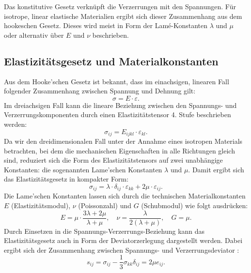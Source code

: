 Das konstitutive Gesetz verknüpft die Verzerrungen mit den Spannungen. Für isotrope, linear elastische Materialien ergibt sich dieser Zusammenhang aus dem hookeschen Gesetz. Dieses wird meist in Form der Lamé-Konstanten $\lambda$ und $\mu$ oder alternativ über $E$ und $\nu$ beschrieben.

\subsection{Elastizitätsgesetz und Materialkonstanten}
Aus dem Hooke’schen Gesetz ist bekannt, dass im einachsigen, linearen Fall folgender Zusammenhang zwischen Spannung und Dehnung gilt:
\begin{equation}
	\sigma = 
	E \cdot \varepsilon.
\end{equation}
Im dreiachsigen Fall kann die lineare Beziehung zwischen den Spannungs- und Verzerrungskomponenten durch einen Elastizitätstensor 4. Stufe beschrieben werden:
\begin{equation}
	\sigma_{ij} = 
	E_{ijkl} \cdot \varepsilon_{kl}.
\end{equation}
Da wir den dreidimensionalen Fall unter der Annahme eines isotropen Materials betrachten, bei dem die mechanischen Eigenschaften in alle Richtungen gleich sind, reduziert sich die Form des Elastizitätstensors auf zwei unabhängige Konstanten: die sogenannten Lame’schen Konstanten $\lambda$ und $\mu$. 
Damit ergibt sich das Elastizitätsgesetz in kompakter Form:
\begin{equation}
	\sigma_{ij} = 
	\lambda \cdot \delta_{ij} \cdot \varepsilon_{kk} + 2\mu \cdot \varepsilon_{ij}.
\end{equation}
Die Lame’schen Konstanten lassen sich durch die technischen Materialkonstanten $E$ (Elastizitätsmodul), $\nu$ (Poissonzahl) und $G$ (Schubmodul) wie folgt ausdrücken:
\begin{equation}
	E = 
	\mu \cdot \frac{3\lambda + 2\mu}{\lambda + \mu}, \quad 
	\nu = 
	\frac{\lambda}{2(\lambda + \mu)}, \quad 
	G = 
	\mu.
\end{equation}
Durch Einsetzen in die Spannungs-Verzerrungs-Beziehung kann das Elastizitätsgesetz auch in Form der Deviatorzerlegung dargestellt werden. 
Dabei ergibt sich der Zusammenhang zwischen Spannungs- und Verzerrungsdeviator \cite{elastomechanik:Grundlagen_der_Elastizitaetstheorie}:
\begin{equation}
	s_{ij} = 
	\sigma_{ij} - \frac{1}{3} \sigma_{kk} \delta_{ij} = 
	2\mu e_{ij}.
\end{equation}